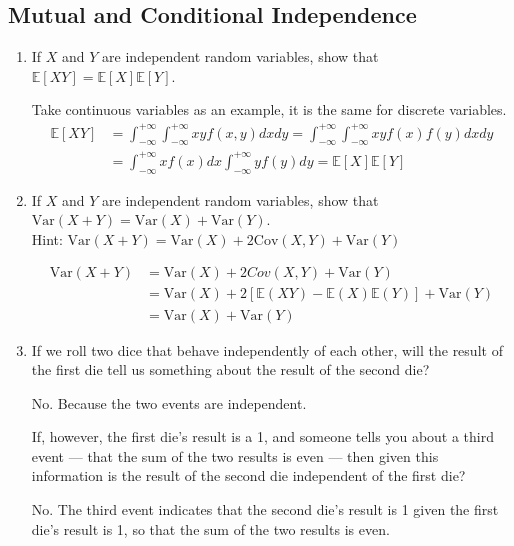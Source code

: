 \documentclass[a4paper]{article}
\theoremstyle{definition}
\newcommand{\Var}{\mathrm{Var}}
\newcommand{\Cov}{\mathrm{Cov}}
\newenvironment{soln}{
    \leavevmode\color{blue}\ignorespaces
}{}
\begin{document}
\subsection{Mutual and Conditional Independence}
\begin{enumerate}
\item If $X$ and $Y$ are independent random variables, show that
  $\mathbb{E}[XY] = \mathbb{E}[X]\mathbb{E}[Y]$.
  
  \begin{soln}
  Take continuous variables as an example, it is the same for discrete variables.
  \begin{equation*}
  \begin{aligned}
  \mathbb{E}[XY] &= \int_{-\infty}^{+\infty}\int_{-\infty}^{+\infty}xyf(x,y)dxdy = \int_{-\infty}^{+\infty}\int_{-\infty}^{+\infty}xyf(x)f(y)dxdy \\
  &= \int_{-\infty}^{+\infty}xf(x)dx\int_{-\infty}^{+\infty}yf(y)dy = \mathbb{E}[X]\mathbb{E}[Y]
  \end{aligned}
  \end{equation*}
  \end{soln}
  
\item If $X$ and $Y$ are independent random variables, show that
  $\Var(X+Y) = \Var(X) + \Var(Y)$. \\
  Hint: $\Var(X+Y) = \Var(X) + 2\Cov(X, Y) + \Var(Y)$
  
  \begin{soln}
  \begin{equation*}
  \begin{aligned}
  \Var(X+Y) &= \Var(X) + 2Cov(X,Y) + \Var(Y) \\ 
  &= \Var(X) + 2[\mathbb{E}(XY) - \mathbb{E}(X)\mathbb{E}(Y)] + \Var(Y) \\ 
  &= \Var(X) + \Var(Y)
  \end{aligned}
  \end{equation*}
  \end{soln}
 
\item If we roll two dice that behave independently of each
  other, will the result of the first die tell us something about the
  result of the second die? 
  
  \begin{soln}
  No. Because the two events are independent.
  \end{soln}
  
  If, however, the first die's result is a 1,
  and someone tells you about a third event --- that the sum of the two
  results is even --- then given this information is the result of the second die
  independent of the first die? 
  
  \begin{soln}
  No. The third event indicates that the second die's result is 1 given the first die's result is 1, so that the sum of the two results is even.
  \end{soln}
\end{enumerate}
\end{document}
